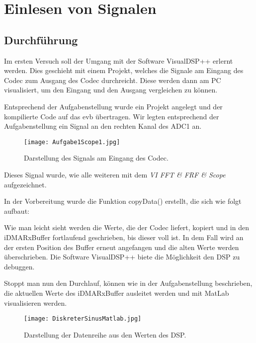 \chapter{Einlesen von Signalen}
\section{Durchführung}
Im ersten Versuch soll der Umgang mit der Software VisualDSP++ erlernt werden. 
Dies geschieht mit einem Projekt, welches die Signale am Eingang des Codec zum 
Ausgang des Codec durchreicht. Diese werden dann am PC visualisiert, um den Eingang und den Ausgang vergleichen zu können.\\\par 

Entsprechend der Aufgabenstellung wurde ein Projekt angelegt und der kompilierte Code auf das \gls{evb} übertragen. 
Wir legten entsprechend der Aufgabenstellung ein Signal an den rechten Kanal des ADC1 an. 


\begin{figure}[bp!]
  \centering
    \texttt{[image: Aufgabe1Scope1.jpg]}
  \caption{Darstellung des Signals am Eingang des Codec.}
  \label{fig:SinusFunktionsGen}
\end{figure}


Dieses Signal wurde, wie alle weiteren mit dem \textit{VI FFT \& FRF \& Scope} 
aufgezeichnet.\pagebreak

In der Vorbereitung wurde die Funktion copyData() erstellt, die sich wie folgt 
aufbaut:
\begin{adjustbox}{width=\textwidth,keepaspectratio}

\end{adjustbox}

Wie man leicht sieht werden die Werte, die der Codec liefert, kopiert und in den iDMARxBuffer 
fortlaufend geschrieben, bis dieser voll ist. 
In dem Fall wird an der ersten Position des Buffer erneut angefangen und die alten Werte werden überschrieben.
Die Software VisualDSP++ biete die Möglichkeit den DSP zu debuggen.\pagebreak


Stoppt man nun den Durchlauf, können wie in der Aufgabenstellung beschrieben, 
die aktuellen Werte des iDMARxBuffer ausleitet werden und mit MatLab visualisieren werden. 
\begin{figure}[!htb]
  \centerline{
    \texttt{[image: DiskreterSinusMatlab.jpg]}}
      \caption{Darstellung der Datenreihe aus den Werten des DSP.}
      \label{fig:SinusMatlab}
\end{figure}

